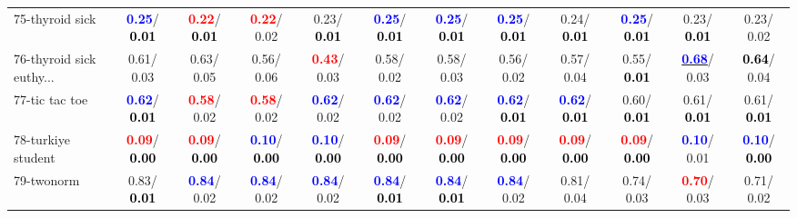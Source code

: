 \begin{table}[h]
\begin{center}
{\begin{tabular}{lc|c|c|c|c|c|c|c|c|c|c}
75-thyroid sick & \textcolor{blue}{\textbf{  0.25}}/\textcolor{black}{\textbf{  0.01}} & \textcolor{red}{\textbf{  0.22}}/\textcolor{black}{\textbf{  0.01}} & \textcolor{red}{\textbf{  0.22}}/  0.02 &   0.23/\textcolor{black}{\textbf{  0.01}} & \textcolor{blue}{\textbf{  0.25}}/\textcolor{black}{\textbf{  0.01}} & \textcolor{blue}{\textbf{  0.25}}/\textcolor{black}{\textbf{  0.01}} & \textcolor{blue}{\textbf{  0.25}}/\textcolor{black}{\textbf{  0.01}} &   0.24/\textcolor{black}{\textbf{  0.01}} & \textcolor{blue}{\textbf{  0.25}}/\textcolor{black}{\textbf{  0.01}} &   0.23/\textcolor{black}{\textbf{  0.01}} &   0.23/  0.02 \\
76-thyroid sick euthy... &   0.61/  0.03 &   0.63/  0.05 &   0.56/  0.06 & \textcolor{red}{\textbf{  0.43}}/  0.03 &   0.58/  0.02 &   0.58/  0.03 &   0.56/  0.02 &   0.57/  0.04 &   0.55/\textcolor{black}{\textbf{  0.01}} & \underline{\textcolor{blue}{\textbf{  0.68}}}/  0.03 & \textcolor{black}{\textbf{  0.64}}/  0.04 \\
77-tic tac toe & \textcolor{blue}{\textbf{  0.62}}/\textcolor{black}{\textbf{  0.01}} & \textcolor{red}{\textbf{  0.58}}/  0.02 & \textcolor{red}{\textbf{  0.58}}/  0.02 & \textcolor{blue}{\textbf{  0.62}}/  0.02 & \textcolor{blue}{\textbf{  0.62}}/  0.02 & \textcolor{blue}{\textbf{  0.62}}/  0.02 & \textcolor{blue}{\textbf{  0.62}}/\textcolor{black}{\textbf{  0.01}} & \textcolor{blue}{\textbf{  0.62}}/\textcolor{black}{\textbf{  0.01}} &   0.60/\textcolor{black}{\textbf{  0.01}} &   0.61/\textcolor{black}{\textbf{  0.01}} &   0.61/\textcolor{black}{\textbf{  0.01}} \\
78-turkiye student & \textcolor{red}{\textbf{  0.09}}/\textcolor{black}{\textbf{  0.00}} & \textcolor{red}{\textbf{  0.09}}/\textcolor{black}{\textbf{  0.00}} & \textcolor{blue}{\textbf{  0.10}}/\textcolor{black}{\textbf{  0.00}} & \textcolor{blue}{\textbf{  0.10}}/\textcolor{black}{\textbf{  0.00}} & \textcolor{red}{\textbf{  0.09}}/\textcolor{black}{\textbf{  0.00}} & \textcolor{red}{\textbf{  0.09}}/\textcolor{black}{\textbf{  0.00}} & \textcolor{red}{\textbf{  0.09}}/\textcolor{black}{\textbf{  0.00}} & \textcolor{red}{\textbf{  0.09}}/\textcolor{black}{\textbf{  0.00}} & \textcolor{red}{\textbf{  0.09}}/\textcolor{black}{\textbf{  0.00}} & \textcolor{blue}{\textbf{  0.10}}/  0.01 & \textcolor{blue}{\textbf{  0.10}}/\textcolor{black}{\textbf{  0.00}} \\ \hline
79-twonorm &   0.83/\textcolor{black}{\textbf{  0.01}} & \textcolor{blue}{\textbf{  0.84}}/  0.02 & \textcolor{blue}{\textbf{  0.84}}/  0.02 & \textcolor{blue}{\textbf{  0.84}}/  0.02 & \textcolor{blue}{\textbf{  0.84}}/\textcolor{black}{\textbf{  0.01}} & \textcolor{blue}{\textbf{  0.84}}/\textcolor{black}{\textbf{  0.01}} & \textcolor{blue}{\textbf{  0.84}}/  0.02 &   0.81/  0.04 &   0.74/  0.03 & \textcolor{red}{\textbf{  0.70}}/  0.03 &   0.71/  0.02 \\

\end{tabular}}
\end{center}
\end{table}

